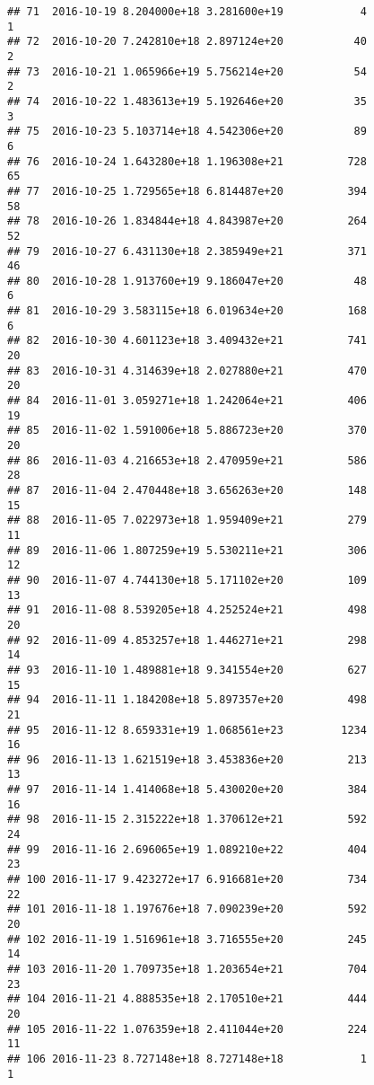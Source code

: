 \documentclass[]{article}
\begin{document}
\begin{verbatim}
## 71  2016-10-19 8.204000e+18 3.281600e+19            4               1
## 72  2016-10-20 7.242810e+18 2.897124e+20           40               2
## 73  2016-10-21 1.065966e+19 5.756214e+20           54               2
## 74  2016-10-22 1.483613e+19 5.192646e+20           35               3
## 75  2016-10-23 5.103714e+18 4.542306e+20           89               6
## 76  2016-10-24 1.643280e+18 1.196308e+21          728              65
## 77  2016-10-25 1.729565e+18 6.814487e+20          394              58
## 78  2016-10-26 1.834844e+18 4.843987e+20          264              52
## 79  2016-10-27 6.431130e+18 2.385949e+21          371              46
## 80  2016-10-28 1.913760e+19 9.186047e+20           48               6
## 81  2016-10-29 3.583115e+18 6.019634e+20          168               6
## 82  2016-10-30 4.601123e+18 3.409432e+21          741              20
## 83  2016-10-31 4.314639e+18 2.027880e+21          470              20
## 84  2016-11-01 3.059271e+18 1.242064e+21          406              19
## 85  2016-11-02 1.591006e+18 5.886723e+20          370              20
## 86  2016-11-03 4.216653e+18 2.470959e+21          586              28
## 87  2016-11-04 2.470448e+18 3.656263e+20          148              15
## 88  2016-11-05 7.022973e+18 1.959409e+21          279              11
## 89  2016-11-06 1.807259e+19 5.530211e+21          306              12
## 90  2016-11-07 4.744130e+18 5.171102e+20          109              13
## 91  2016-11-08 8.539205e+18 4.252524e+21          498              20
## 92  2016-11-09 4.853257e+18 1.446271e+21          298              14
## 93  2016-11-10 1.489881e+18 9.341554e+20          627              15
## 94  2016-11-11 1.184208e+18 5.897357e+20          498              21
## 95  2016-11-12 8.659331e+19 1.068561e+23         1234              16
## 96  2016-11-13 1.621519e+18 3.453836e+20          213              13
## 97  2016-11-14 1.414068e+18 5.430020e+20          384              16
## 98  2016-11-15 2.315222e+18 1.370612e+21          592              24
## 99  2016-11-16 2.696065e+19 1.089210e+22          404              23
## 100 2016-11-17 9.423272e+17 6.916681e+20          734              22
## 101 2016-11-18 1.197676e+18 7.090239e+20          592              20
## 102 2016-11-19 1.516961e+18 3.716555e+20          245              14
## 103 2016-11-20 1.709735e+18 1.203654e+21          704              23
## 104 2016-11-21 4.888535e+18 2.170510e+21          444              20
## 105 2016-11-22 1.076359e+18 2.411044e+20          224              11
## 106 2016-11-23 8.727148e+18 8.727148e+18            1               1

\end{verbatim}
\end{document}

